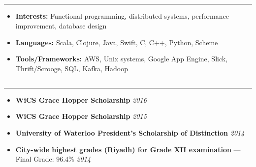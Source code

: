 \documentclass[7pt,letterpaper]{article}
\begin{document}
\subsection*{}
\hrule
\vspace{1.0em}
  \begin{itemize}
    \parskip=-0.5em
  \itemsep0.5em

    \item[]
      \textbf{Interests:} Functional programming, distributed systems,
      performance improvement, database design
    \item[]
      \textbf{Languages:} Scala, Clojure, Java, Swift, C, C++, Python, Scheme
    \item[]
      \textbf{Tools/Frameworks:} AWS, Unix systems, Google App Engine, Slick,
      Thrift/Scrooge, SQL, Kafka, Hadoop
  \end{itemize}

\subsection*{}
\hrule
\vspace{1.0em}
  \begin{itemize}
    \parskip=-0.5em
  \itemsep0.5em
  \item[]
    \textbf{WiCS Grace Hopper Scholarship} \hfill \emph{2016}
  \item[]
    \textbf{WiCS Grace Hopper Scholarship} \hfill \emph{2015}
    \item[]
      \textbf{University of Waterloo President's Scholarship of Distinction} \hfill \emph{2014}
  \item[]
    \textbf{City-wide highest grades (Riyadh) for Grade XII examination} ---
    Final Grade: 96.4\% \hfill \emph{2014}
    
  \end{itemize}
\end{document}
